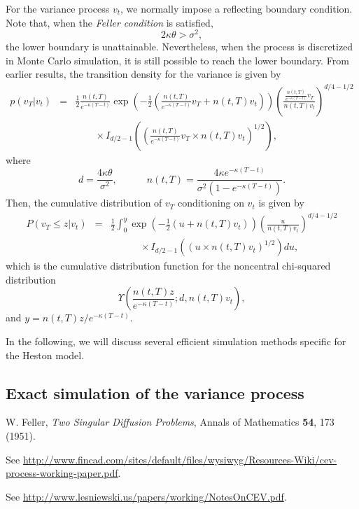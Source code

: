 \documentclass[12pt]{article}
\begin{document}
  For the variance process $v_t$, we normally impose a reflecting boundary condition. Note that,
  when the {\it Feller condition} is satisfied,
  \begin{equation}
    2\kappa\theta >\sigma^2,
  \end{equation}
  the lower boundary is unattainable. Nevertheless, when the process is discretized in Monte Carlo
  simulation, it is still possible to reach the lower boundary. From earlier results, the transition
  density for the variance is given by
  \begin{eqnarray}
    p\left(\left. v_T\right|v_t\right)&=&\frac{1}{2}\frac{n(t,T)}{e^{-\kappa(T-t)}}
          \exp\left(-\frac{1}{2}\left(\frac{n(t,T)}{e^{-\kappa(T-t)}}v_T+n(t,T)v_t\right)\right)
          \left(\frac{\displaystyle \frac{n(t,T)}{e^{-\kappa(T-t)}}v_T}{n(t,T)v_t}\right)^{d/4-1/2}\nonumber\\
          && \quad\quad\times I_{d/2-1}\left(\left(\frac{n(t,T)}{e^{-\kappa(T-t)}}v_T\times n(t,T)v_t\right)^{1/2}\right),
  \end{eqnarray}
  where
  \begin{equation}
    d=\frac{4\kappa\theta}{\sigma^2},\quad\quad\quad n(t,T) = \frac{4\kappa e^{-\kappa(T-t)}}{\sigma^2\left(1-e^{-\kappa(T-t)}\right)}.
  \end{equation}
  Then, the cumulative distribution of $v_T$ conditioning on $v_t$ is given by
  \begin{eqnarray}
    P\left(\left. v_T \le z\right|v_t\right) &=& \frac{1}{2}\int_0^{y}\exp\left(-\frac{1}{2}\left(u+n(t,T)v_t\right)\right)
                \left(\frac{u}{n(t,T)v_t}\right)^{d/4-1/2}\nonumber\\
                && \quad\quad\quad\times I_{d/2-1}\left(\left(u\times n(t,T)v_t\right)^{1/2}\right)du,
  \end{eqnarray}
  which is the cumulative distribution function for the noncentral chi-squared distribution
  \begin{equation}
    \Upsilon\left(\frac{n(t,T) z}{e^{-\kappa(T-t)}}; d, n(t,T)v_t\right),
  \end{equation}
  and $y=n(t,T) z/e^{-\kappa(T-t)}$.

  In the following, we will discuss several efficient simulation methods specific for the Heston model.

  \subsection{Exact simulation of the variance process}




\begin{thebibliography}{99}
    W. Feller, {\it Two Singular Diffusion Problems}, Annals of Mathematics {\bf 54}, 173 (1951).

    See \url{http://www.fincad.com/sites/default/files/wysiwyg/Resources-Wiki/cev-process-working-paper.pdf}.

    See \url{http://www.lesniewski.us/papers/working/NotesOnCEV.pdf}.

\end{thebibliography}
\end{document}

